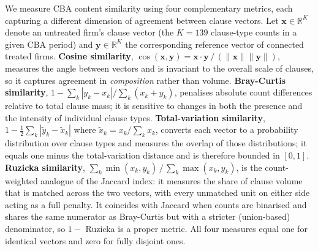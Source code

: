 We measure CBA content similarity using four complementary metrics, each capturing a different dimension of agreement between clause vectors.
Let $\mathbf{x} \in \mathbb{R}^K$ denote an untreated firm's clause vector (the $K = 139$ clause-type counts in a given CBA period) and $\mathbf{y} \in \mathbb{R}^K$ the corresponding reference vector of connected treated firms.
\textbf{Cosine similarity}, $\cos(\mathbf{x}, \mathbf{y}) = \mathbf{x} \cdot \mathbf{y} \,/\, (\|\mathbf{x}\| \|\mathbf{y}\|)$, measures the angle between vectors and is invariant to the overall scale of clauses, so it captures agreement in \emph{composition} rather than volume.
\textbf{Bray-Curtis similarity}, $1 - \sum_k |y_k - x_k| / \sum_k (x_k + y_k)$, penalises absolute count differences relative to total clause mass; it is sensitive to changes in both the presence and the intensity of individual clause types.
\textbf{Total-variation similarity}, $1 - \tfrac{1}{2}\sum_k |\tilde{y}_k - \tilde{x}_k|$ where $\tilde{x}_k = x_k / \sum_k x_k$, converts each vector to a probability distribution over clause types and measures the overlap of those distributions; it equals one minus the total-variation distance and is therefore bounded in $[0,1]$.
\textbf{Ruzicka similarity}, $\sum_k \min(x_k, y_k) \,/\, \sum_k \max(x_k, y_k)$, is the count-weighted analogue of the Jaccard index: it measures the share of clause volume that is matched across the two vectors, with every unmatched unit on either side acting as a full penalty. It coincides with Jaccard when counts are binarised and shares the same numerator as Bray-Curtis but with a stricter (union-based) denominator, so $1 - $ Ruzicka is a proper metric.
All four measures equal one for identical vectors and zero for fully disjoint ones.
